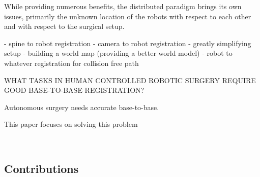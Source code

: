 
While providing numerous benefits, the distributed paradigm brings its own issues, primarily the unknown location of the robots with respect to each other and with respect to the surgical setup. 

- spine to robot registration
- camera to robot registration
- greatly simplifying setup
- building a world map (providing a better world model)
- robot to whatever registration for collision free path

WHAT TASKS IN HUMAN CONTROLLED ROBOTIC SURGERY REQUIRE GOOD BASE-TO-BASE REGISTRATION?

Autonomous surgery needs accurate base-to-base.

This paper focuses on solving this problem


~\cite{optas}
~\cite{point_cloud_based_robot_cell_calib}
~\citep{hand_eye_calibration_robotic_assisted}





\subsection{Contributions}

